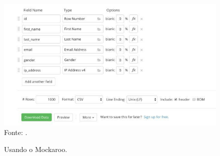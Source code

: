 \documentclass[
	12pt,				%
	openright,			%
	oneside,			%
	a4paper,			%
	english,			%
	brazil				%
	]{abntex2}
\begin{document}
		\begin{figure}[h]
			\centering
			\caption{Usando o Mockaroo.}
			\includegraphics[width=\linewidth]{./figures/TrabalhosRelacionados/mockaroo.jpg}
			\label{fig:mockaroo}
			\footnotesize Fonte: \cite{mockaroo}.
		\end{figure}
\end{document}
